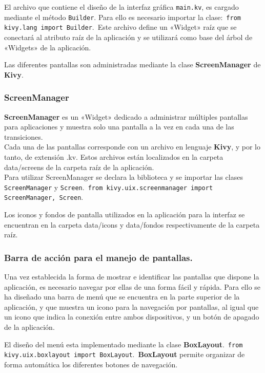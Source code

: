 El archivo que contiene el diseño de la interfaz gráfica \texttt{main.kv}, es cargado mediante el método \texttt{Builder}.
Para ello es necesario importar la clase:\
\texttt{from kivy.lang import Builder}.\
Este archivo define un «Widget» raíz que se conectará al atributo raíz de la aplicación y se utilizará como base del árbol de «Widgets» de la aplicación.



Las diferentes pantallas son administradas mediante la clase \textbf{ScreenManager} de \textbf{Kivy}.

\subsubsection{ScreenManager}
\textbf{ScreenManager} es un «Widget» dedicado a administrar múltiples pantallas para aplicaciones y muestra solo una pantalla a la vez en cada una de las transiciones.\\
Cada una de las pantallas corresponde con un archivo en lenguaje \textbf{Kivy}, y por lo tanto, de extensión .kv. Estos archivos están localizados en la carpeta data/screens de la carpeta raíz de la aplicación.\\
Para utilizar ScreenManager se declara la biblioteca y se importar las clases \texttt{ScreenManager} y \texttt{Screen}.\
\texttt{from kivy.uix.screenmanager import ScreenManager, Screen}.\

Los iconos y fondos de pantalla utilizados en la aplicación para la interfaz se encuentran en la carpeta data/icons y data/fondos respectivamente de la carpeta raíz.\\

\subsubsection{Barra de acción para el manejo de pantallas.}
Una vez establecida la forma de mostrar e identificar las pantallas que dispone la aplicación, es necesario navegar por ellas de una forma fácil y rápida. Para ello se ha diseñado una barra de menú que se encuentra en la parte superior de la aplicación, y que muestra un icono para la navegación por pantallas, al igual que un icono que indica la conexión entre ambos dispositivos, y un botón de apagado de la aplicación.

El diseño del menú esta implementado mediante la clase \textbf{BoxLayout}.\
\texttt{from kivy.uix.boxlayout import BoxLayout}.\
\textbf{BoxLayout} permite organizar de forma automática los diferentes botones de navegación.





